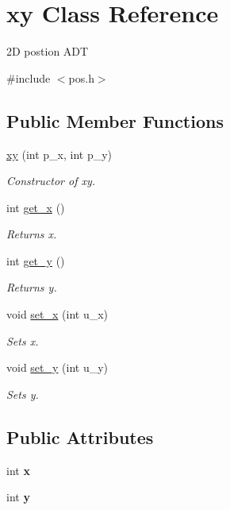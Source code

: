 \hypertarget{classxy}{}\section{xy Class Reference}
\label{classxy}


2D postion A\+DT  




{\ttfamily \#include $<$pos.\+h$>$}

\subsection*{Public Member Functions}
\begin{DoxyCompactItemize}
\item 
\hyperlink{classxy_ac1690ba262823ec76316338f76c3be50}{xy} (int p\+\_\+x, int p\+\_\+y)
\begin{DoxyCompactList}\small\item\em Constructor of xy. \end{DoxyCompactList}\item 
int \hyperlink{classxy_aace93cb41e0d6420555d36577390d727}{get\+\_\+x} ()
\begin{DoxyCompactList}\small\item\em Returns x. \end{DoxyCompactList}\item 
int \hyperlink{classxy_a2ae181119299e2a0f2cd012b21eec6d1}{get\+\_\+y} ()
\begin{DoxyCompactList}\small\item\em Returns y. \end{DoxyCompactList}\item 
void \hyperlink{classxy_a678930bc07affb2959df965ddcf6e453}{set\+\_\+x} (int u\+\_\+x)
\begin{DoxyCompactList}\small\item\em Sets x. \end{DoxyCompactList}\item 
void \hyperlink{classxy_aa45ba61f107343f3eb499f85635bfd99}{set\+\_\+y} (int u\+\_\+y)
\begin{DoxyCompactList}\small\item\em Sets y. \end{DoxyCompactList}\end{DoxyCompactItemize}
\subsection*{Public Attributes}
\begin{DoxyCompactItemize}
\item 
\mbox{\label{classxy_acd933dd71ec45b3f27bb7cbbc8fc7008}} 
int {\bfseries x}
\item 
\mbox{\label{classxy_a1b4e476c8c2757be112c6be285f59ef1}} 
int {\bfseries y}
\end{DoxyCompactItemize}


